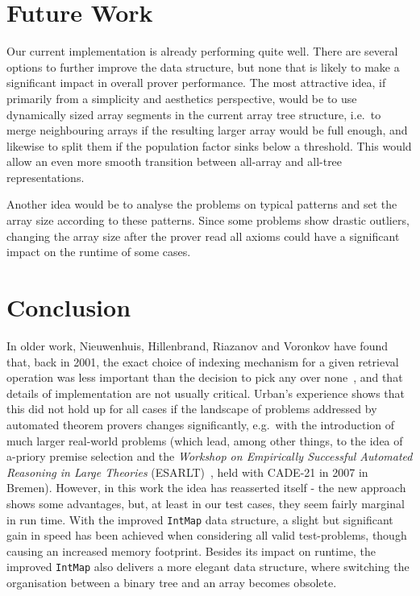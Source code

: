 \documentclass[]{ceurart}
\begin{document}
\section{Future Work}

Our current implementation is already performing quite well. There are
several options to further improve the data structure, but none that
is likely to make a significant impact in overall prover
performance. The most attractive idea, if primarily from a simplicity
and aesthetics perspective, would be to use dynamically sized array
segments in the current array tree structure, i.e.\ to merge
neighbouring arrays if the resulting larger array would be full
enough, and likewise to split them if the population factor sinks
below a threshold. This would allow an even more smooth transition
between all-array and all-tree representations.

Another idea would be to analyse the problems on typical patterns and
set the array size according to these patterns. Since some problems
show drastic outliers, changing the array size after the prover read
all axioms could have a significant impact on the runtime of some
cases.

\section{Conclusion}

In older work, Nieuwenhuis, Hillenbrand, Riazanov and Voronkov have
found that, back in 2001, the exact choice of indexing mechanism for a
given retrieval operation was less important than the decision to pick
any over none~\cite{NHRV:IJCAR-2001}, and that details of
implementation are not usually critical. Urban's experience shows that
this did not hold up for all cases if the landscape of problems
addressed by automated theorem provers changes significantly, e.g.\
with the introduction of much larger real-world problems (which lead,
among other things, to the idea of a-priory premise selection and the
\emph{Workshop on Empirically Successful Automated Reasoning in Large
  Theories} (ESARLT)~\cite{SUS:ESARLT-2007}, held with CADE-21 in 2007
in Bremen). However, in this work the idea has reasserted itself - the
new approach shows some advantages, but, at least in our test cases,
they seem fairly marginal in run time.
With the improved \texttt{IntMap} data structure, a slight but significant
gain in speed has been achieved when considering all valid test-problems,
though causing an increased memory footprint. Besides its impact on runtime,
the improved \texttt{IntMap} also delivers a more elegant data structure,
where switching the organisation between a binary tree and an array becomes
obsolete.
\end{document}
